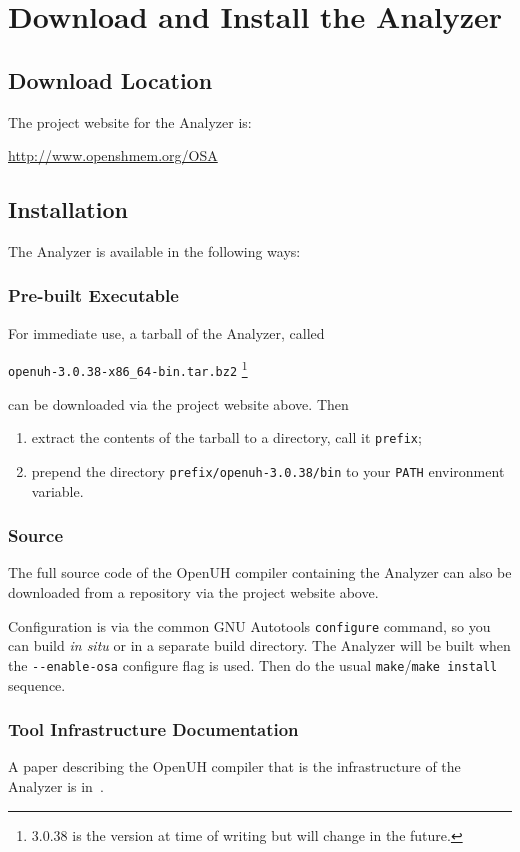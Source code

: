 \section{Download and Install the \openshmem Analyzer}
\label{chapter:download}

\subsection{Download Location}

The project website for the \openshmem Analyzer is:

\begin{center}
\url{http://www.openshmem.org/OSA}
\end{center}

\subsection{Installation}

The \openshmem Analyzer is available in the following ways:

\subsubsection{Pre-built Executable}

For immediate use, a tarball of the \openshmem Analyzer, called
\begin{center}
\texttt{openuh-3.0.38-x86\_64-bin.tar.bz2}
\footnote{3.0.38 is the version at time of writing but will change in
  the future.}
\end{center}
can be downloaded via the project website above.  Then

\begin{enumerate}
\item extract the contents of the tarball to a directory, call it
  \texttt{prefix};
\item prepend the directory \texttt{prefix/openuh-3.0.38/bin} to your
  \texttt{PATH} environment variable.
\end{enumerate}

\subsubsection{Source}

The full source code of the OpenUH compiler containing the \openshmem
Analyzer can also be downloaded from a repository via the project
website above.

Configuration is via the common GNU Autotools \texttt{configure}
command, so you can build \emph{in situ} or in a separate build
directory.  The \openshmem Analyzer will be built when the
\texttt{-{}-{}enable-osa} configure flag is used.  Then do the usual
\texttt{make}/\texttt{make install} sequence.

\subsubsection{Tool Infrastructure Documentation}

A paper describing the OpenUH compiler that is the infrastructure of
the \openshmem Analyzer is in~\cite{chapman2012experiencesspringer}.
